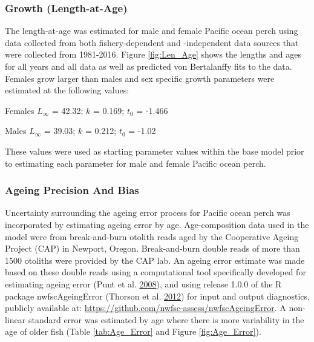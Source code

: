 \documentclass[12pt,]{article}
\begin{document}
\subsubsection{Growth (Length-at-Age)}\label{growth-length-at-age}

The length-at-age was estimated for male and female Pacific ocean perch
using data collected from both fishery-dependent and -independent data
sources that were collected from 1981-2016. Figure \ref{fig:Len_Age}
shows the lengths and ages for all years and all data as well as
predicted von Bertalanffy fits to the data. Females grow larger than
males and sex specific growth parameters were estimated at the following
values:

\begin{centering}

Females $L_{\infty}$ = 42.32; $k$ = 0.169; $t_0$ = -1.466

Males $L_{\infty}$ = 39.03; $k$ = 0.212; $t_0$ = -1.02

\end{centering}

These values were used as starting parameter values within the base
model prior to estimating each parameter for male and female Pacific
ocean perch.

\subsubsection{Ageing Precision And
Bias}\label{ageing-precision-and-bias}

Uncertainty surrounding the ageing error process for Pacific ocean perch
was incorporated by estimating ageing error by age. Age-composition data
used in the model were from break-and-burn otolith reads aged by the
Cooperative Ageing Project (CAP) in Newport, Oregon. Break-and-burn
double reads of more than 1500 otoliths were provided by the CAP lab. An
ageing error estimate was made based on these double reads using a
computational tool specifically developed for estimating ageing error
(Punt et al. \protect\hyperlink{ref-punt_quantifying_2008}{2008}), and
using release 1.0.0 of the R package nwfscAgeingError (Thorson et al.
\protect\hyperlink{ref-thorson_nwfscageingerror:_2012}{2012}) for input
and output diagnostics, publicly available at:
\url{https://github.com/nwfsc-assess/nwfscAgeingError}. A non-linear
standard error was estimated by age where there is more variability in
the age of older fish (Table \ref{tab:Age_Error} and Figure
\ref{fig:Age_Error}).
\end{document}
